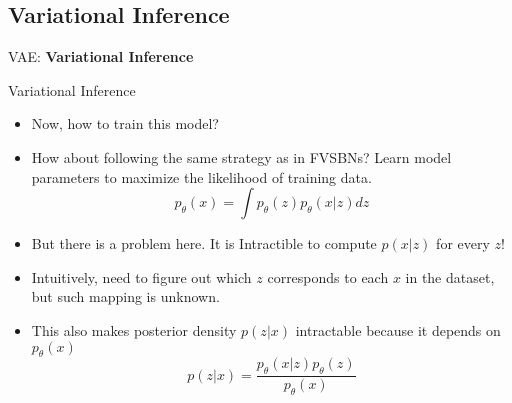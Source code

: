 \subsection{Variational Inference}
\begin{frame}{}
    \LARGE VAE: \textbf{Variational Inference}
\end{frame}

\begin{frame}{Variational Inference}
\begin{itemize}
    \item Now, how to train this model?
    \item<2-> How about following the same strategy as in FVSBNs? Learn model parameters to maximize the likelihood of training data.
    $$p_{\theta}(x) = \int p_{\theta}(z) p_{\theta}(x|z) dz$$
    \item<3-> But there is a problem here. It is Intractible to compute $p(x|z)$ for every $z$!
    \item<4-> Intuitively, need to figure out which $z$ corresponds to each $x$ in the dataset, but such mapping is unknown.
    \item<5-> This also makes posterior density $p(z|x)$ intractable because it depends on $p_{\theta}(x)$
    $$p(z|x) = \frac{p_{\theta}(x|z) p_{\theta}(z)}{p_{\theta}(x)}$$
\end{itemize}
\end{frame}

